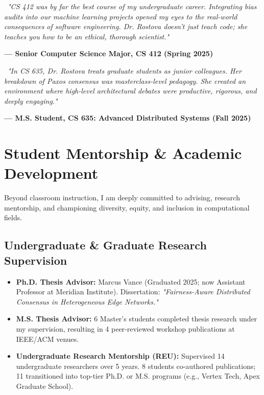\documentclass[11pt,a4paper]{article}
\begin{document}
\vspace{3pt}

\begin{quotecard}
  \color{NeutralDark}\small
  \faQuoteLeft\ \textit{"CS 412 was by far the best course of my undergraduate career. Integrating bias audits into our machine learning projects opened my eyes to the real-world consequences of software engineering. Dr. Rostova doesn't just teach code; she teaches you how to be an ethical, thorough scientist."} \par
  \raggedleft{}\fontsize{8.5}{10}\selectfont\color{AccentTeal}\textbf{--- Senior Computer Science Major, CS 412 (Spring 2025)}
\end{quotecard}

\vspace{3pt}

\begin{quotecard}
  \color{NeutralDark}\small
  \faQuoteLeft\ \textit{"In CS 635, Dr. Rostova treats graduate students as junior colleagues. Her breakdown of Paxos consensus was masterclass-level pedagogy. She created an environment where high-level architectural debates were productive, rigorous, and deeply engaging."} \par
  \raggedleft{}\fontsize{8.5}{10}\selectfont\color{AccentTeal}\textbf{--- M.S. Student, CS 635: Advanced Distributed Systems (Fall 2025)}
\end{quotecard}

\vspace{6pt}

\section{Student Mentorship \& Academic Development}

Beyond classroom instruction, I am deeply committed to advising, research mentorship, and championing diversity, equity, and inclusion in computational fields.

\subsection{Undergraduate \& Graduate Research Supervision}
\begin{itemize}[leftmargin=1.5em, labelsep=0.5em, itemsep=3pt]
  \item \textbf{Ph.D. Thesis Advisor:} Marcus Vance (Graduated 2025; now Assistant Professor at Meridian Institute). Dissertation: \textit{"Fairness-Aware Distributed Consensus in Heterogeneous Edge Networks."}
  \item \textbf{M.S. Thesis Advisor:} 6 Master's students completed thesis research under my supervision, resulting in 4 peer-reviewed workshop publications at IEEE/ACM venues.
  \item \textbf{Undergraduate Research Mentorship (REU):} Supervised 14 undergraduate researchers over 5 years. 8 students co-authored publications; 11 transitioned into top-tier Ph.D. or M.S. programs (e.g., Vertex Tech, Apex Graduate School).
\end{itemize}
\end{document}
